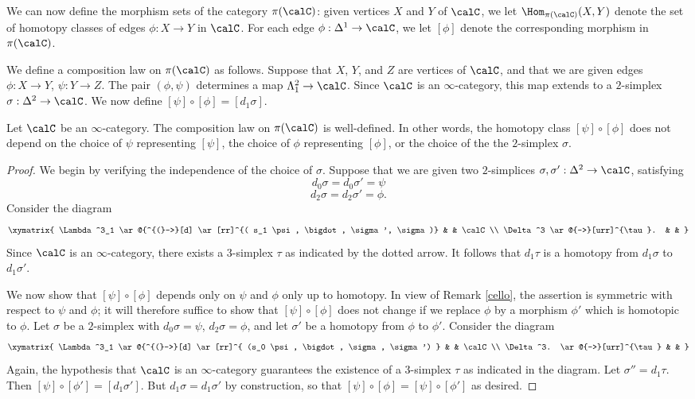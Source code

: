 We can now define the morphism sets of the category $\pi(\calC)$: given vertices $X$ and $Y$ of $\calC$, we let $\Hom_{\pi(\calC)}(X,Y)$ denote the set of homotopy
classes of edges $\phi: X \rightarrow Y$ in $\calC$. For each edge
$\phi: \Delta^1 \rightarrow \calC$, we let $[ \phi ]$ denote the corresponding morphism in
$\pi(\calC)$.

We define a composition law on $\pi(\calC)$ as follows. Suppose that $X$, $Y$, and $Z$ are vertices of $\calC$, and that we are given 
edges $\phi: X \rightarrow Y$, $ \psi : Y \rightarrow Z$.
The pair $(\phi, \psi)$ determines a map $\Lambda^2_1 \rightarrow \calC$. Since $\calC$ is an $\infty$-category, this map extends to a $2$-simplex $\sigma: \Delta^2 \rightarrow \calC$. We now define
$[ \psi] \circ [ \phi ] = [ d_1 \sigma ]$.

\begin{proposition}\label{trug}
Let $\calC$ be an $\infty$-category.
The composition law on $\pi(\calC)$ is well-defined. In other words, the homotopy class $[\psi] \circ [\phi]$ does not depend on the choice of $\psi$ representing $[\psi]$, the choice of $\phi$ representing $[ \phi]$, or the choice of the the $2$-simplex $\sigma$.
\end{proposition}

\begin{proof}
We begin by verifying the independence of the choice of $\sigma$. Suppose that we are given two $2$-simplices $\sigma, \sigma': \Delta^2 \rightarrow \calC$, satisfying
$$ d_0 \sigma = d_0 \sigma' = \psi $$
$$ d_2 \sigma = d_2 \sigma' = \phi.$$
Consider the diagram
$$ \xymatrix{ \Lambda^3_1 \ar@{^{(}->}[d] \ar[rr]^{( s_1 \psi, \bigdot, \sigma', \sigma)} & & \calC \\
\Delta^3 \ar@{-->}[urr]^{\tau}. & & }$$
Since $\calC$ is an $\infty$-category, there exists a $3$-simplex $\tau$ as indicated by the dotted arrow. It follows that $d_1 \tau$ is a homotopy from $d_1 \sigma$ to $d_1 \sigma'$.

We now show that $[\psi ] \circ [\phi]$ depends only on $\psi$ and $\phi$ only up to homotopy.
In view of Remark \ref{cello}, the assertion is symmetric with respect to $\psi$ and $\phi$; it will therefore suffice to show that $[ \psi ] \circ [ \phi ]$ does not change if we replace $\phi$ by a morphism $\phi'$ which is homotopic to $\phi$. Let $\sigma$ be a $2$-simplex with
$d_0 \sigma = \psi$, $d_2 \sigma = \phi$, and let $\sigma'$ be a homotopy from $\phi$ to $\phi'$.
Consider the diagram
$$ \xymatrix{ \Lambda^3_1 \ar@{^{(}->}[d] \ar[rr]^{ (s_0 \psi, \bigdot, \sigma, \sigma') } & & \calC \\
\Delta^3. \ar@{-->}[urr]^{\tau} & & }$$
Again, the hypothesis that $\calC$ is an $\infty$-category guarantees the existence of a $3$-simplex $\tau$ as indicated in the diagram. Let $\sigma'' = d_1 \tau$. Then 
$[ \psi ] \circ [ \phi' ] = [ d_1 \sigma' ]$. But $d_1 \sigma = d_1 \sigma'$ by construction, so that
$[ \psi ] \circ [ \phi ] = [ \psi ] \circ [ \phi' ]$ as desired.
\end{proof}

